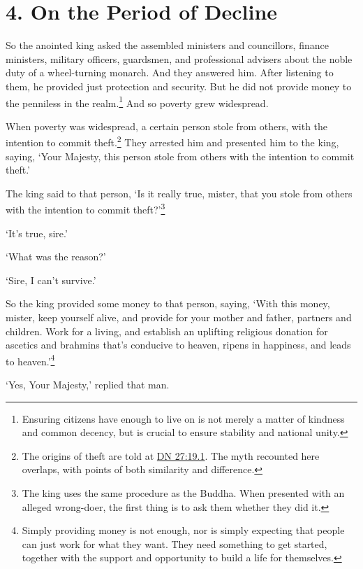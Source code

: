 \documentclass[12pt,openany]{book}%
\begin{document}
\section*{4. On the Period of Decline }

So the anointed king asked the assembled ministers and councillors, finance ministers, military officers, guardsmen, and professional advisers about the noble duty of a wheel-turning monarch. And they answered him. After listening to them, he provided just protection and security. But he did not provide money to the penniless in the realm.\footnote{Ensuring citizens have enough to live on is not merely a matter of kindness and common decency, but is crucial to ensure stability and national unity. } And so poverty grew widespread. 

When poverty was widespread, a certain person stole from others, with the intention to commit theft.\footnote{The origins of theft are told at \href{https://suttacentral.net/dn27/en/sujato\#19.1}{DN 27:19.1}. The myth recounted here overlaps, with points of both similarity and difference. } They arrested him and presented him to the king, saying, ‘Your Majesty, this person stole from others with the intention to commit theft.’ 

The king said to that person, ‘Is it really true, mister, that you stole from others with the intention to commit theft?’\footnote{The king uses the same procedure as the Buddha. When presented with an alleged wrong-doer, the first thing is to ask them whether they did it. } 

‘It’s true, sire.’ 

‘What was the reason?’ 

‘Sire, I can’t survive.’ 

So the king provided some money to that person, saying, ‘With this money, mister, keep yourself alive, and provide for your mother and father, partners and children. Work for a living, and establish an uplifting religious donation for ascetics and brahmins that’s conducive to heaven, ripens in happiness, and leads to heaven.’\footnote{Simply providing money is not enough, nor is simply expecting that people can just work for what they want. They need something to get started, together with the support and opportunity to build a life for themselves. } 

‘Yes, Your Majesty,’ replied that man. 
\end{document}
